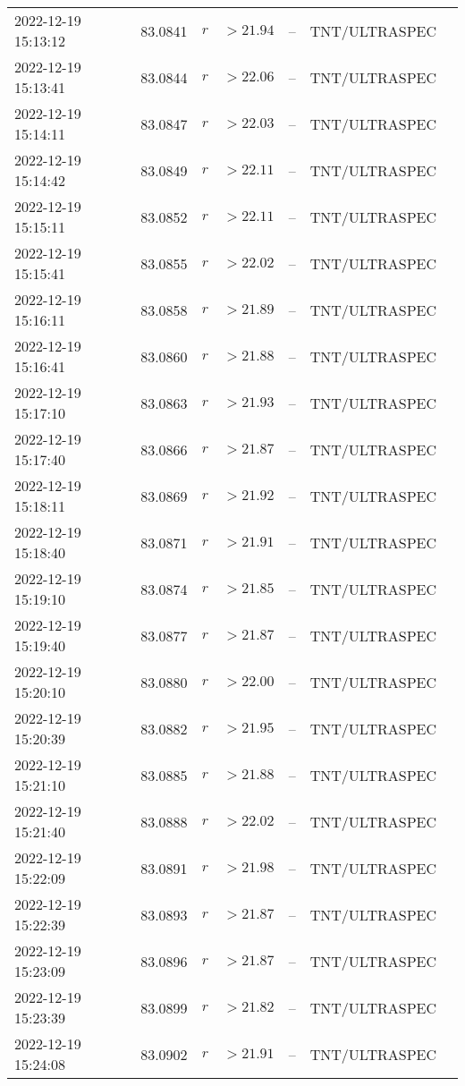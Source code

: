 \documentclass{nature_plusfigure}
\begin{document}
\begin{supplement}
\begin{center}
\begin{longtable}{lllllll}
2022-12-19 15:13:12 & 83.0841 & $r$ & $>21.94$ & -- & TNT/ULTRASPEC &  \\ 
2022-12-19 15:13:41 & 83.0844 & $r$ & $>22.06$ & -- & TNT/ULTRASPEC &  \\ 
2022-12-19 15:14:11 & 83.0847 & $r$ & $>22.03$ & -- & TNT/ULTRASPEC &  \\ 
2022-12-19 15:14:42 & 83.0849 & $r$ & $>22.11$ & -- & TNT/ULTRASPEC &  \\ 
2022-12-19 15:15:11 & 83.0852 & $r$ & $>22.11$ & -- & TNT/ULTRASPEC &  \\ 
2022-12-19 15:15:41 & 83.0855 & $r$ & $>22.02$ & -- & TNT/ULTRASPEC &  \\ 
2022-12-19 15:16:11 & 83.0858 & $r$ & $>21.89$ & -- & TNT/ULTRASPEC &  \\ 
2022-12-19 15:16:41 & 83.0860 & $r$ & $>21.88$ & -- & TNT/ULTRASPEC &  \\ 
2022-12-19 15:17:10 & 83.0863 & $r$ & $>21.93$ & -- & TNT/ULTRASPEC &  \\ 
2022-12-19 15:17:40 & 83.0866 & $r$ & $>21.87$ & -- & TNT/ULTRASPEC &  \\ 
2022-12-19 15:18:11 & 83.0869 & $r$ & $>21.92$ & -- & TNT/ULTRASPEC &  \\ 
2022-12-19 15:18:40 & 83.0871 & $r$ & $>21.91$ & -- & TNT/ULTRASPEC &  \\ 
2022-12-19 15:19:10 & 83.0874 & $r$ & $>21.85$ & -- & TNT/ULTRASPEC &  \\ 
2022-12-19 15:19:40 & 83.0877 & $r$ & $>21.87$ & -- & TNT/ULTRASPEC &  \\ 
2022-12-19 15:20:10 & 83.0880 & $r$ & $>22.00$ & -- & TNT/ULTRASPEC &  \\ 
2022-12-19 15:20:39 & 83.0882 & $r$ & $>21.95$ & -- & TNT/ULTRASPEC &  \\ 
2022-12-19 15:21:10 & 83.0885 & $r$ & $>21.88$ & -- & TNT/ULTRASPEC &  \\ 
2022-12-19 15:21:40 & 83.0888 & $r$ & $>22.02$ & -- & TNT/ULTRASPEC &  \\ 
2022-12-19 15:22:09 & 83.0891 & $r$ & $>21.98$ & -- & TNT/ULTRASPEC &  \\ 
2022-12-19 15:22:39 & 83.0893 & $r$ & $>21.87$ & -- & TNT/ULTRASPEC &  \\ 
2022-12-19 15:23:09 & 83.0896 & $r$ & $>21.87$ & -- & TNT/ULTRASPEC &  \\ 
2022-12-19 15:23:39 & 83.0899 & $r$ & $>21.82$ & -- & TNT/ULTRASPEC &  \\ 
2022-12-19 15:24:08 & 83.0902 & $r$ & $>21.91$ & -- & TNT/ULTRASPEC &  \\ 

\end{longtable}
\end{center}
\end{supplement}
\end{document}
